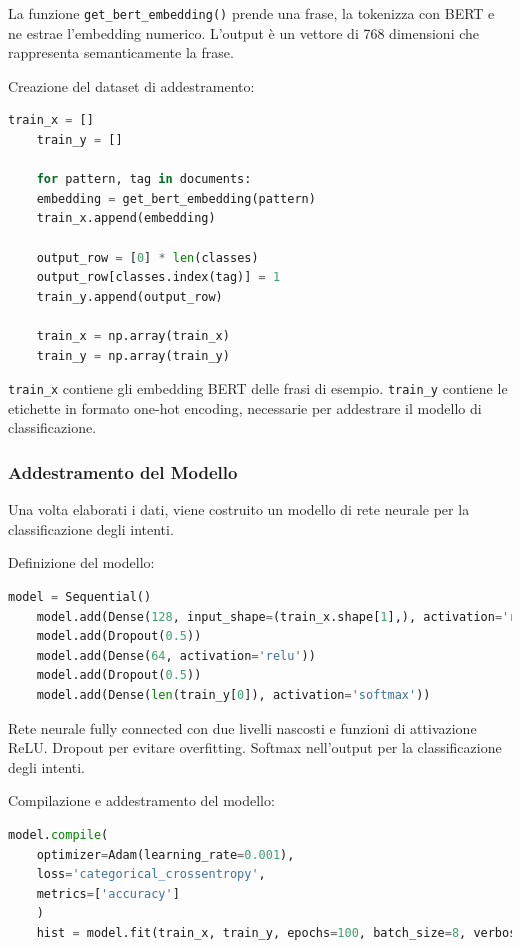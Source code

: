 \documentclass[12pt, letterpaper]{article}
\begin{document}
La funzione \texttt{get\_bert\_embedding()} prende una frase, la tokenizza con BERT e ne estrae l’embedding numerico. L’output è un vettore di 768 dimensioni che rappresenta semanticamente la frase.

Creazione del dataset di addestramento:

\begin{lstlisting}[language=Python]
	train_x = []
	train_y = []
	
	for pattern, tag in documents:
	embedding = get_bert_embedding(pattern)
	train_x.append(embedding)
	
	output_row = [0] * len(classes)
	output_row[classes.index(tag)] = 1
	train_y.append(output_row)
	
	train_x = np.array(train_x)
	train_y = np.array(train_y)
\end{lstlisting}

\texttt{train\_x} contiene gli embedding BERT delle frasi di esempio. \texttt{train\_y} contiene le etichette in formato one-hot encoding, necessarie per addestrare il modello di classificazione.

\subsubsection{Addestramento del Modello}

Una volta elaborati i dati, viene costruito un modello di rete neurale per la classificazione degli intenti.

Definizione del modello:

\begin{lstlisting}[language=Python]
	model = Sequential()
	model.add(Dense(128, input_shape=(train_x.shape[1],), activation='relu'))
	model.add(Dropout(0.5))
	model.add(Dense(64, activation='relu'))
	model.add(Dropout(0.5))
	model.add(Dense(len(train_y[0]), activation='softmax'))
\end{lstlisting}

Rete neurale fully connected con due livelli nascosti e funzioni di attivazione ReLU. Dropout per evitare overfitting. Softmax nell’output per la classificazione degli intenti.

Compilazione e addestramento del modello:

\begin{lstlisting}[language=Python]
	model.compile(
	optimizer=Adam(learning_rate=0.001),
	loss='categorical_crossentropy',
	metrics=['accuracy']
	)
	hist = model.fit(train_x, train_y, epochs=100, batch_size=8, verbose=1)
\end{lstlisting}
\end{document}
